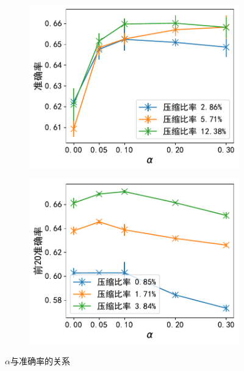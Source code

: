 \begin{figure}[h!]
    \centering
    \begin{subfigure}{0.46\linewidth}
        \includegraphics[width=1\linewidth]{Z_Resources/随机topk_cifar-alpha.pdf}
        \label{fig:cifar-trainloss}
    \end{subfigure}
    \begin{subfigure}{0.46\linewidth}
        \includegraphics[width=1\linewidth]{Z_Resources/随机topk_yoochoose-alpha.pdf}
        \label{fig:cifar-generror}
    \end{subfigure}
    \caption{$\alpha$与准确率的关系}
    \label{fig:randomized_topk-alpha-acc}
\end{figure}

